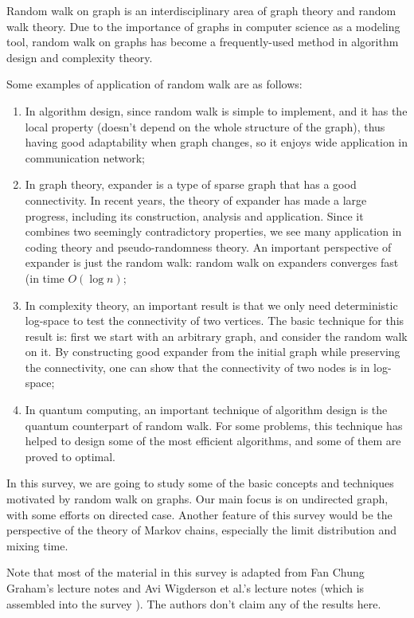 Random walk on graph is an interdisciplinary area of graph theory
and random walk theory. Due to the importance of graphs in computer
science as a modeling tool, random walk on graphs has become a
frequently-used method in algorithm design and complexity theory.

Some examples of application of random walk are as follows:

\begin{enumerate}
\item In algorithm design, since random walk \cite{randomized_book} is simple to implement,
and it has the local property (doesn't depend on the whole structure
of the graph), thus having good adaptability when graph changes, so
it enjoys wide application in communication network\cite{network};
\item In graph theory, expander is a type of sparse graph that has a
good connectivity. In recent years, the theory of expander has made
a large progress, including its construction, analysis and
application. Since it combines two seemingly contradictory
properties, we see many application in coding theory and
pseudo-randomness theory.\cite{expander} An important perspective of
expander is just the random walk: random walk on expanders converges
fast (in time $O(\log n)$;
\item In complexity theory, an important result is that we only need
deterministic log-space to test the connectivity of two vertices.
\cite{stcon} The basic technique for this result is: first we start
with an arbitrary graph, and consider the random walk on it. By
constructing good expander from the initial graph while preserving
the connectivity, one can show that the connectivity of two nodes is
in log-space;
\item In quantum computing, an important technique of algorithm
design is the quantum counterpart of random walk. For some problems,
this technique has helped to design some of the most efficient
algorithms, and some of them are proved to optimal.\cite{quantum}
\end{enumerate}

In this survey, we are going to study some of the basic concepts and
techniques motivated by random walk on graphs. Our main focus is on
undirected graph, with some efforts on directed case. Another
feature of this survey would be the perspective of the theory of
Markov chains, especially the limit distribution and mixing time.\cite{mixing_time}

Note that most of the material in this survey is adapted from Fan
Chung Graham's lecture notes\cite{fan} and Avi Wigderson et al.'s lecture
notes (which is assembled into the survey \cite{expander}). The authors don't claim
any of the results here.
